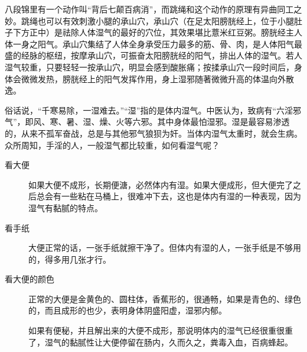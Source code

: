 \documentclass{ctexart}
\begin{document}
\begin{description}
    八段锦里有一个动作叫“背后七颠百病消”，而跳绳和这个动作的原理有异曲同工之妙。跳绳也可以有效刺激小腿的承山穴，承山穴（在足太阳膀胱经上，位于小腿肚子下方正中）是祛除人体湿气的最好的穴位，其效果堪比薏米红豆粥。膀胱经主人体一身之阳气。承山穴集结了人体全身承受压力最多的筋、骨、肉，是人体阳气最盛的经脉的枢纽，按摩承山穴，可振奋太阳膀胱经的阳气，排出人体的湿气。若人湿气较重，只要轻轻一按承山穴，明显会感到酸胀痛；按揉承山穴一段时间后，身体会微微发热，膀胱经上的阳气发挥作用，身上湿邪随著微微升高的体温向外散逸。

    俗话说，“千寒易除，一湿难去。”“湿”指的是体内湿气。中医认为，致病有“六淫邪气”，即风、寒、暑、湿、燥、火等六邪。其中身体最怕湿邪。湿是最容易渗透的，从来不孤军奋战，总是与其他邪气狼狈为奸。当体内湿气太重时，就会生病。众所周知，手淫的人，一般湿气都比较重，如何看湿气呢？

    \begin{description}
        \item[看大便] 如果大便不成形，长期便溏，必然体内有湿。如果大便成形，但大便完了之后总会有一些粘在马桶上，很难冲下去，这也是体内有湿的一种表现，因为湿气有黏腻的特点。
        \item[看手纸] 大便正常的话，一张手纸就擦干净了。但体内有湿的人，一张手纸是不够用的，得多用几张才行。
        \item[看大便的颜色] 正常的大便是金黄色的、圆柱体，香蕉形的，很通畅，如果是青色的、绿色的，而且成形的也少，表明身体阴盛阳虚，湿邪内郁。
        \item[] 如果有便秘，并且解出来的大便不成形，那说明体内的湿气已经很重很重了，湿气的黏腻性让大便停留在肠内，久而久之，粪毒入血，百病蜂起。
    \end{description}


\end{description}
\end{document}
